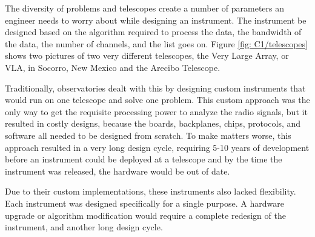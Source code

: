The diversity of problems and telescopes create a number of parameters an engineer needs to worry about while designing an instrument.
The instrument be designed based on the algorithm required to process the data, the bandwidth of the data, the number of channels, and the list goes on.
Figure \ref{fig: C1/telescopes} shows two pictures of two very different telescopes, the Very Large Array, or VLA,  in Socorro, New Mexico and the Arecibo Telescope.

Traditionally, observatories dealt with this by designing custom instruments that would run on one telescope and solve one problem.
This custom approach was the only way to get the requisite processing power to analyze the radio signals, but it resulted in costly designs, because the boards, backplanes, chips, protocols, and software all needed to be designed from scratch.
To make matters worse, this approach resulted in a very long design cycle,  requiring 5-10 years of development before an instrument could be deployed at a telescope and by the time the instrument was released, the hardware would be out of date.

Due to their custom implementations, these instruments also lacked flexibility. 
Each instrument was designed specifically for a single purpose.
A hardware upgrade or algorithm modification would require a complete redesign of the instrument, and another long design cycle.





